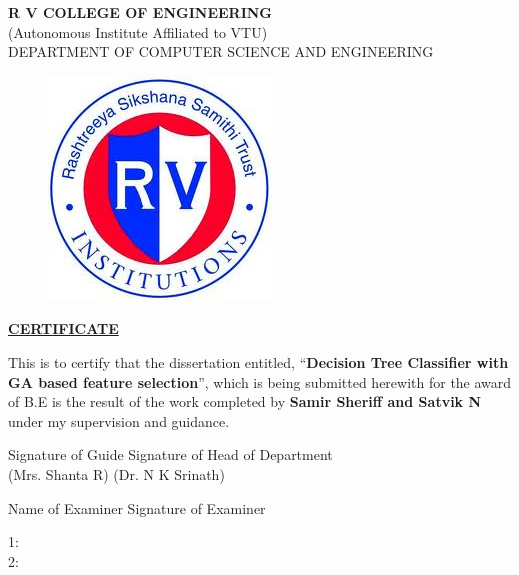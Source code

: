 \documentclass[12pt]{report}
\begin{document}
\begin{titlepage}
\newpage
\begin{center}
{\bfseries\large R V COLLEGE OF ENGINEERING}\\
{\normalsize (Autonomous Institute Affiliated to VTU)}\\
{\normalsize DEPARTMENT OF COMPUTER SCIENCE AND ENGINEERING}\\
\end{center}
	
\begin{figure}[h!]
	\centering
		\includegraphics[scale=0.5]{RVCE.png}
\end{figure}

\begin{center}
\bf{\underline{CERTIFICATE}}
\end{center}
\noindent This is to certify that the dissertation entitled, ``\textbf{Decision Tree Classifier with GA based feature selection}'',  which is being submitted herewith for the award of B.E is the result of the work completed by \textbf{Samir Sheriff and Satvik N}  under my supervision and guidance.
\vspace{.5in}

\begin{flushleft} 
\vspace{.5in}
Signature of Guide 	
\hspace{4cm}
 Signature of Head of Department  \\
(Mrs. Shanta R)  \hspace{6cm}(Dr. N K Srinath) \\
 
 \end{flushleft} 
\begin{flushleft}
\hspace{1in}Name of Examiner \hspace{1.25in} Signature of Examiner
\end{flushleft}
\begin{flushleft}
1: \\
\vspace{.5in} 
2: 
\end{flushleft}
\end{titlepage}
\end{document}
